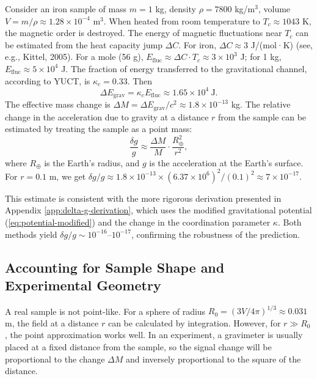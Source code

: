 \documentclass[12pt]{article}
\theoremstyle{remark}
\newcommand{\kappac}{\kappa_c}
\begin{document}
	Consider an iron sample of mass $m = 1$ kg, density $\rho = 7800$ kg/m$^3$, volume $V = m/\rho \approx 1.28\times10^{-4}$ m$^3$. When heated from room temperature to $T_c \approx 1043$ K, the magnetic order is destroyed. The energy of magnetic fluctuations near $T_c$ can be estimated from the heat capacity jump $\Delta C$. For iron, $\Delta C \approx 3$ J/(mol·K) (see, e.g., Kittel, 2005). For a mole (56 g), $E_{\text{fluc}} \approx \Delta C \cdot T_c \approx 3\times10^3$ J; for 1 kg, $E_{\text{fluc}} \approx 5\times10^4$ J. The fraction of energy transferred to the gravitational channel, according to YUCT, is $\kappac = 0.33$. Then
	\begin{equation}
		\Delta E_{\text{grav}} = \kappac E_{\text{fluc}} \approx 1.65\times10^4\ \text{J}.
	\end{equation}
	The effective mass change is $\Delta M = \Delta E_{\text{grav}} / c^2 \approx 1.8\times10^{-13}$ kg. The relative change in the acceleration due to gravity at a distance $r$ from the sample can be estimated by treating the sample as a point mass:
	\begin{equation}
		\frac{\delta g}{g} \approx \frac{\Delta M}{M} \cdot \frac{R_\oplus^2}{r^2},
		\label{eq:delta-g-estimate}
	\end{equation}
	where $R_\oplus$ is the Earth's radius, and $g$ is the acceleration at the Earth's surface. For $r = 0.1$ m, we get $\delta g/g \approx 1.8\times10^{-13} \times (6.37\times10^6)^2 / (0.1)^2 \approx 7\times10^{-17}$. 
	
	This estimate is consistent with the more rigorous derivation presented in Appendix \ref{app:delta-g-derivation}, which uses the modified gravitational potential (\ref{eq:potential-modified}) and the change in the coordination parameter $\kappa$. Both methods yield $\delta g/g \sim 10^{-16}$–$10^{-17}$, confirming the robustness of the prediction.
	
	\subsection{Accounting for Sample Shape and Experimental Geometry}
	\label{subsec:lab-geometry}
	
	A real sample is not point-like. For a sphere of radius $R_0 = (3V/4\pi)^{1/3} \approx 0.031$ m, the field at a distance $r$ can be calculated by integration. However, for $r \gg R_0$, the point approximation works well. In an experiment, a gravimeter is usually placed at a fixed distance from the sample, so the signal change will be proportional to the change $\Delta M$ and inversely proportional to the square of the distance.
	
\end{document}
